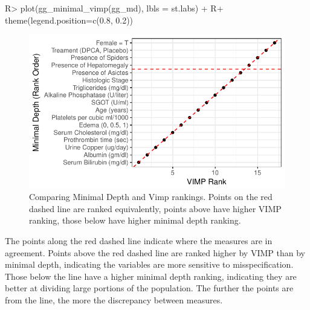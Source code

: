 \documentclass[article]{jss}
\begin{document}
\begin{Schunk}
\begin{Sinput}
R> plot(gg_minimal_vimp(gg_md), lbls = st.labs) +
R+   theme(legend.position=c(0.8, 0.2))
\end{Sinput}
\begin{figure}[!htb]

{\centering \includegraphics{fig-rfs/rfs-depthVimp-1} 

}

\caption[Comparing Minimal Depth and Vimp rankings]{Comparing Minimal Depth and Vimp rankings. Points on the red dashed line are ranked equivalently, points above have higher VIMP ranking, those below have higher minimal depth ranking.}\label{fig:depthVimp}
\end{figure}
\end{Schunk}

The points along the red dashed line indicate where the measures are in
agreement. Points above the red dashed line are ranked higher by VIMP
than by minimal depth, indicating the variables are more sensitive to
misspecification. Those below the line have a higher minimal depth
ranking, indicating they are better at dividing large portions of the
population. The further the points are from the line, the more the
discrepancy between measures.
\end{document}
